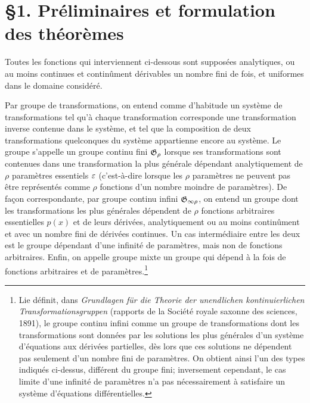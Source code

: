 \section*{\S{}1. Préliminaires et formulation des théorèmes}

Toutes les fonctions qui interviennent ci-dessous sont supposées analytiques, ou au moins continues et continûment dérivables un nombre fini de fois, et uniformes dans le domaine considéré.

Par \og{}groupe de transformations\fg{}, on entend comme d'habitude un système de transformations tel qu'à chaque transformation corresponde une transformation inverse contenue dans le système, et tel que la composition de deux transformations quelconques du système appartienne encore au système. Le groupe s'appelle un groupe continu fini \(\mathfrak G_\rho\) lorsque ses transformations sont contenues dans une transformation la plus générale dépendant analytiquement de \(\rho\) paramètres essentiels \(\varepsilon\) (c'est-à-dire lorsque les \(\rho\) paramètres ne peuvent pas être représentés comme \(\rho\) fonctions d'un nombre moindre de paramètres). De façon correspondante, par groupe continu infini \(\mathfrak G_{\infty\rho}\), on entend un groupe dont les transformations les plus générales dépendent de \(\rho\) fonctions arbitraires essentielles \(p(x)\) et de leurs dérivées, analytiquement ou au moins continûment et avec un nombre fini de dérivées continues. Un cas intermédiaire entre les deux est le groupe dépendant d'une infinité de paramètres, mais non de fonctions arbitraires. Enfin, on appelle groupe mixte un groupe qui dépend à la fois de fonctions arbitraires et de paramètres.\footnote{Lie définit, dans \emph{Grundlagen für die Theorie der unendlichen kontinuierlichen Transformationsgruppen} (rapports de la Société royale saxonne des sciences, 1891), le groupe continu infini comme un groupe de transformations dont les transformations sont données par les solutions les plus générales d'un système d'équations aux dérivées partielles, dès lors que ces solutions ne dépendent pas seulement d'un nombre fini de paramètres. On obtient ainsi l'un des types indiqués ci-dessus, différent du groupe fini; inversement cependant, le cas limite d'une infinité de paramètres n'a pas nécessairement à satisfaire un système d'équations différentielles.}

